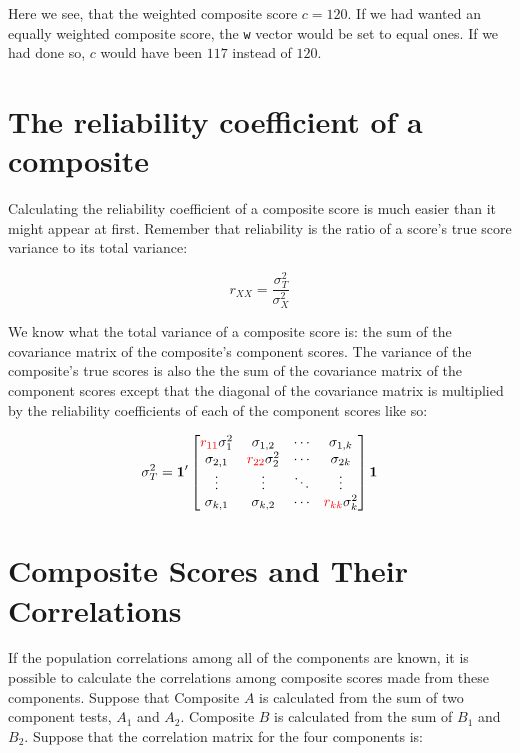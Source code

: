 \documentclass[nohyper,justified,marginals=raggedright]{tufte-book}\usepackage[]{graphicx}\usepackage[]{color}
\newcommand{\bs}[1]{\boldsymbol{#1}}
\begin{document}
Here we see, that the weighted composite score $c = 120$. If we had wanted an equally weighted composite score, the \texttt{w} vector would be set to equal ones. If we had done so, $c$ would have been $117$
instead of $120$.

\section{The reliability coefficient of a composite}

Calculating the reliability coefficient of a composite score is much easier than it might appear at first. Remember that reliability is the ratio of a score's true score variance to its total variance:

\[
r_{XX} = \frac{\sigma_T^2}{\sigma_X^2}
\]

We know what the total variance of a composite score is: the sum of the covariance matrix of the composite's component scores. The variance of the composite's true scores is also the the sum of the covariance matrix of the component scores except that the diagonal of the covariance matrix is multiplied by the reliability coefficients of each of the component scores like so:

\[
\sigma_T^2=\bs{1}'\begin{bmatrix}
  {\color{red}r_{11}}\sigma_{1}^2 & \sigma_{1,2} & \cdots & \sigma_{1,k} \\
  \sigma_{2,1} & {\color{red}r_{22}}\sigma_{2}^2 & \cdots & \sigma_{2 k} \\
  \vdots  & \vdots  & \ddots & \vdots  \\
  \sigma_{k,1} & \sigma_{k,2} & \cdots & {\color{red}r_{kk}}\sigma_{k}^2
 \end{bmatrix}\bs{1}
\]



\section{Composite Scores and Their Correlations}

If the population correlations among all of the components are known, it is possible to calculate the correlations among composite scores made from these components. Suppose that Composite $A$ is calculated from the sum of two component tests, $A_1$ and $A_2$. Composite $B$ is calculated from the sum of $B_1$ and $B_2$. Suppose that the correlation matrix for the four components is:
\end{document}
